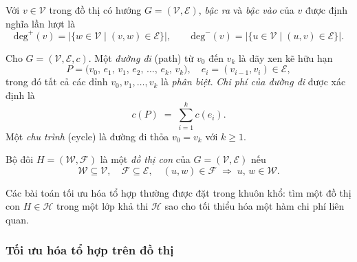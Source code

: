 \begin{definition}
\label{def:degree}
Với $v \in \mathcal{V}$ trong đồ thị có hướng $G = (\mathcal{V}, \mathcal{E})$,
\emph{bậc ra} và \emph{bậc vào} của $v$ được định nghĩa lần lượt là
\begin{equation}
    \mathrm{deg}^+(v)
    = \bigl|\{w \in \mathcal{V} \mid (v,w) \in \mathcal{E}\}\bigr|,
    \qquad
    \mathrm{deg}^-(v)
    = \bigl|\{u \in \mathcal{V} \mid (u,v) \in \mathcal{E}\}\bigr|.
\label{eq:vertex_degree}
\end{equation}
\end{definition}

\begin{definition}
\label{def:path_cycle}
Cho $G = (\mathcal{V}, \mathcal{E}, c)$. Một \emph{đường đi} (path) từ $v_0$
đến $v_k$ là dãy xen kẽ hữu hạn
\begin{equation}
    P = \bigl(v_0,\, e_1,\, v_1,\, e_2,\, \ldots,\, e_k,\, v_k\bigr),
    \quad
    e_i = (v_{i-1}, v_i) \in \mathcal{E},
\label{eq:path_def}
\end{equation}
trong đó tất cả các đỉnh $v_0, v_1, \ldots, v_k$ là \emph{phân biệt}.
\emph{Chi phí của đường đi} được xác định là
\begin{equation}
    c(P) \;=\; \sum_{i=1}^{k} c(e_i).
\label{eq:path_cost}
\end{equation}
Một \emph{chu trình} (cycle) là đường đi thỏa $v_0 = v_k$ với $k \geq 1$.
\end{definition}

\begin{definition}
\label{def:subgraph}
Bộ đôi $H = (\mathcal{W}, \mathcal{F})$ là một \emph{đồ thị con} của
$G = (\mathcal{V}, \mathcal{E})$ nếu
\begin{equation}
    \mathcal{W} \subseteq \mathcal{V},
    \quad
    \mathcal{F} \subseteq \mathcal{E},
    \quad
    (u,w) \in \mathcal{F}
    \;\Rightarrow\;
    u,\, w \in \mathcal{W}.
\label{eq:subgraph_def}
\end{equation}
\end{definition}

Các bài toán tối ưu hóa tổ hợp thường được đặt trong khuôn khổ: tìm một
đồ thị con $H \in \mathcal{H}$ trong một lớp khả thi $\mathcal{H}$ sao cho
tối thiểu hóa một hàm chi phí liên quan.

\subsubsection{Tối ưu hóa tổ hợp trên đồ thị}
\label{subsubsec:combo_opt}

